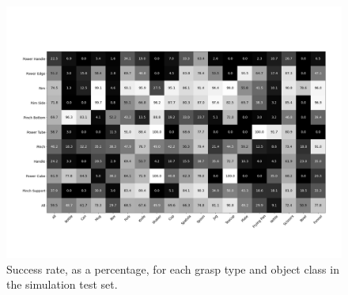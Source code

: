 \begin{figure}[h]
\centering
\includegraphics[width=\columnwidth]{images/mean_success_rate_per_grasp_type_and_object_class}
\caption{\label{fig:gop} Success rate, as a percentage, for each grasp type and object class in the simulation test set.}
\end{figure}



